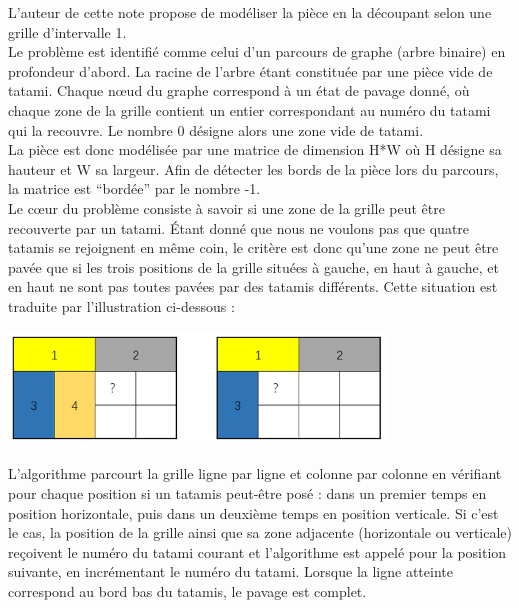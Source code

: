 L'auteur de cette note propose de modéliser la pièce en la découpant selon une grille d'intervalle 1.\\

Le problème est identifié comme celui d'un parcours de graphe (arbre binaire) en profondeur d'abord.
La racine de l'arbre étant constituée par une pièce vide de tatami. Chaque nœud du graphe correspond
à un état de pavage donné, où chaque zone de la grille contient un entier correspondant au numéro du
tatami qui la recouvre. Le nombre 0 désigne alors une zone vide de tatami.\\

La pièce est donc modélisée par une matrice de dimension H*W où H désigne sa hauteur et W sa largeur.
Afin de détecter les bords de la pièce lors du parcours, la matrice est “bordée” par le nombre -1.\\

Le cœur du problème consiste à savoir si une zone de la grille peut être recouverte par un tatami.
Étant donné que nous ne voulons pas que quatre tatamis se rejoignent en même coin, le critère est donc
qu’une zone ne peut être pavée que si les trois positions de la grille situées à gauche, en haut à gauche,
et en haut ne sont pas toutes pavées par des tatamis différents.
Cette situation est traduite par l’illustration ci-dessous :\\

\begin{center}
    \includegraphics[width=10cm]{images/illustrationBeta-algo-2.png}
\end{center}

L’algorithme parcourt la grille ligne par ligne et colonne par colonne en vérifiant pour chaque position
si un tatamis peut-être posé : dans un premier temps en position horizontale, puis dans un deuxième temps
en position verticale. Si c’est le cas, la position de la grille ainsi que sa zone adjacente (horizontale ou verticale)
reçoivent le numéro du tatami courant et l’algorithme est appelé pour la position suivante, en incrémentant le numéro du tatami.
Lorsque la ligne atteinte correspond au bord bas du tatamis, le pavage est complet.\\

